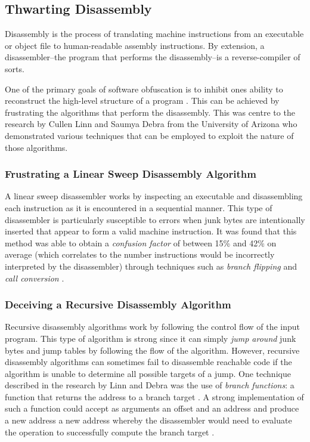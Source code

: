 \documentclass[conference]{IEEEtran}
\begin{document}
\subsection{Thwarting Disassembly}
Disassembly is the process of translating machine instructions from an executable or object file to human-readable assembly instructions. By extension, a disassembler--the program that performs the disassembly--is a reverse-compiler of sorts.

One of the primary goals of software obfuscation is to inhibit ones ability to reconstruct the high-level structure of a program \cite{b5}. This can be achieved by frustrating the algorithms that perform the disassembly. This was centre to the research by Cullen Linn and Saumya Debra from the University of Arizona who demonstrated various techniques that can be employed to exploit the nature of those algorithms.

\subsubsection{Frustrating a Linear Sweep Disassembly Algorithm}
A linear sweep disassembler works by inspecting an executable and disassembling each instruction as it is encountered in a sequential manner. This type of disassembler is particularly susceptible to errors when junk bytes are intentionally inserted that appear to form a valid machine instruction. It was found that this method was able to obtain a \textit{confusion factor} of between 15\% and 42\% on average (which correlates to the number instructions would be incorrectly interpreted by the disassembler) through techniques such as \textit{branch flipping} and \textit{call conversion} \cite{b5}.

\subsubsection{Deceiving a Recursive Disassembly Algorithm}
Recursive disassembly algorithms work by following the control flow of the input program. This type of algorithm is strong since it can simply \textit{jump around} junk bytes and jump tables by following the flow of the algorithm. However, recursive disassembly algorithms can sometimes fail to disassemble reachable code if the algorithm is unable to determine all possible targets of a jump. One technique described in the research by Linn and Debra was the use of \textit{branch functions}: a function that returns the address to a branch target \cite{b5}. A strong implementation of such a function could accept as arguments an offset and an address and produce a new address a new address whereby the disassembler would need to evaluate the operation to successfully compute the branch target \cite{b5}.
\end{document}
